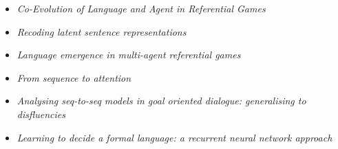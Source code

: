 {
{\begin{itemize}
  \item[] \textit{Co-Evolution of Language and Agent in Referential Games}
\end{itemize}
}

{
{\begin{itemize}
  \item[] \textit{Recoding latent sentence representations}
\end{itemize}
}

{
{\begin{itemize}
  \item[] \textit{Language emergence in multi-agent referential games}
\end{itemize}
}

{
{\begin{itemize}
  \item[] \textit{From sequence to attention}
\end{itemize}
}

{
{\begin{itemize}
  \item[] \textit{Analysing seq-to-seq models in goal oriented dialogue: generalising to disfluencies}
\end{itemize}
}

{
{\begin{itemize}
  \item[] \textit{Learning to decide a formal language: a recurrent neural network approach}
\end{itemize}
}

}}}}}}
